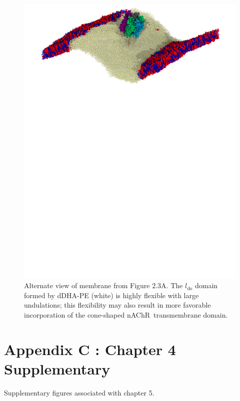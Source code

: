 \documentclass[12pt]{ruthesis_nofloat}
\newcommand{\ldo}{l_{\mathrm{do}}}
\newcommand{\nachr}{nAChR}
\begin{document}
\renewcommand{\thefigure}{B2}
\begin{figure}
		\includegraphics[width=1\linewidth]{ModelMemb_Images/Memb_Curve.pdf}
		\caption[Alternate view of membrane from Figure 2.3A.] {Alternate view of membrane from Figure 2.3A. The $\ldo$ domain formed by dDHA-PE (white) is highly flexible with large undulations; this flexibility may also result in more favorable incorporation of the cone-shaped \nachr~transmembrane domain.}
		\label{fig:Memb_Curve}
\end{figure}

\FloatBarrier


\section*{Appendix C : Chapter 4 Supplementary}
Supplementary figures associated with chapter 5.
\renewcommand{\thetable}{C1}
\end{document}
